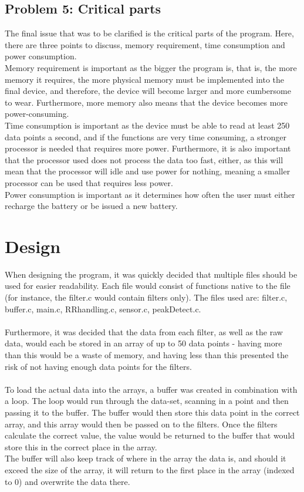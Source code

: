 \documentclass[12pt,a4paper]{article}
\begin{document}
\subsection{Problem 5: Critical parts}
	The final issue that was to be clarified is the critical parts of the program. Here, there are three points to discuss, memory requirement, time consumption and power consumption.\\
	Memory requirement is important as the bigger the program is, that is, the more memory it requires, the more physical memory must be implemented into the final device, and therefore, the device will become larger and more cumbersome to wear. Furthermore, more memory also means that the device becomes more power-consuming.\\
	Time consumption is important as the device must be able to read at least 250 data points a second, and if the functions are very time consuming, a stronger processor is needed that requires more power. Furthermore, it is also important that the processor used does not process the data too fast, either, as this will mean that the processor will idle and use power for nothing, meaning a smaller processor can be used that requires less power.\\
	Power consumption is important as it determines how often the user must either recharge the battery or be issued a new battery.\\
	
\section{Design}
	When designing the program, it was quickly decided that multiple files should be used for easier readability. Each file would consist of functions native to the file (for instance, the filter.c would contain filters only). The files used are: filter.c, buffer.c, main.c, RRhandling.c, sensor.c, peakDetect.c.\\
	\\
	Furthermore, it was decided that the data from each filter, as well as the raw data, would each be stored in an array of up to 50 data points - having more than this would be a waste of memory, and having less than this presented the risk of not having enough data points for the filters.\\
	\\
	To load the actual data into the arrays, a buffer was created in combination with a loop. The loop would run through the data-set, scanning in a point and then passing it to the buffer. The buffer would then store this data point in the correct array, and this array would then be passed on to the filters. Once the filters calculate the correct value, the value would be returned to the buffer that would store this in the correct place in the array.\\
	The buffer will also keep track of where in the array the data is, and should it exceed the size of the array, it will return to the first place in the array (indexed to 0) and overwrite the data there.\\
	\\
\end{document}
